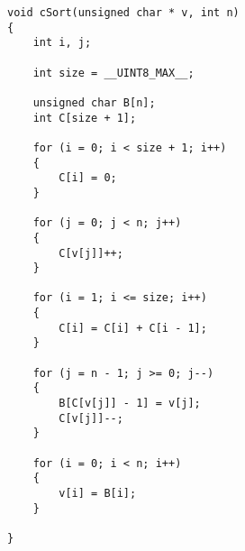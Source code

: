 \begin{lstlisting}[style=CStyle]
void cSort(unsigned char * v, int n)
{
    int i, j;

    int size = __UINT8_MAX__;

    unsigned char B[n];
    int C[size + 1];

    for (i = 0; i < size + 1; i++)
    {
        C[i] = 0;
    }

    for (j = 0; j < n; j++)
    {
        C[v[j]]++;
    }

    for (i = 1; i <= size; i++)
    {
        C[i] = C[i] + C[i - 1];
    }

    for (j = n - 1; j >= 0; j--)
    {
        B[C[v[j]] - 1] = v[j];
        C[v[j]]--;
    }

    for (i = 0; i < n; i++)
    {
        v[i] = B[i];
    }

}
\end{lstlisting}
        